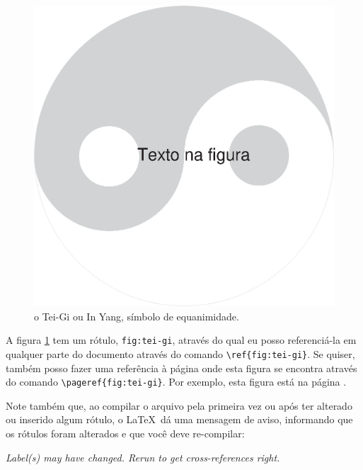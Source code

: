 \documentclass[a4paper,12pt]{article}
\begin{document}

	\begin{figure}[bht]
		\centering
		\includegraphics[height=0.2\textheight]{Tei-Gi}
		\caption{o Tei-Gi ou In Yang, símbolo de equanimidade.}
		\label{fig:tei-gi} %
	\end{figure}
	
	A figura \ref{fig:tei-gi} tem um rótulo, \texttt{fig:tei-gi}, através do
	qual eu posso referenciá-la em qualquer parte do documento através do
	comando \verb|\ref{fig:tei-gi}|. Se quiser, também posso fazer uma
	referência à página onde esta figura se encontra através do comando
	\verb|\pageref{fig:tei-gi}|. Por exemplo, esta figura está na página
	\pageref{fig:tei-gi}.

	Note também que, ao compilar o arquivo pela primeira vez ou após ter
	alterado ou inserido algum rótulo, o \LaTeX\ dá uma mensagem de aviso,
	informando que os rótulos foram alterados e que você deve re-compilar:

	\begin{center}\slshape
		Label(s) may have changed. Rerun to get cross-references right.
	\end{center}
	
	
	
\end{document}
